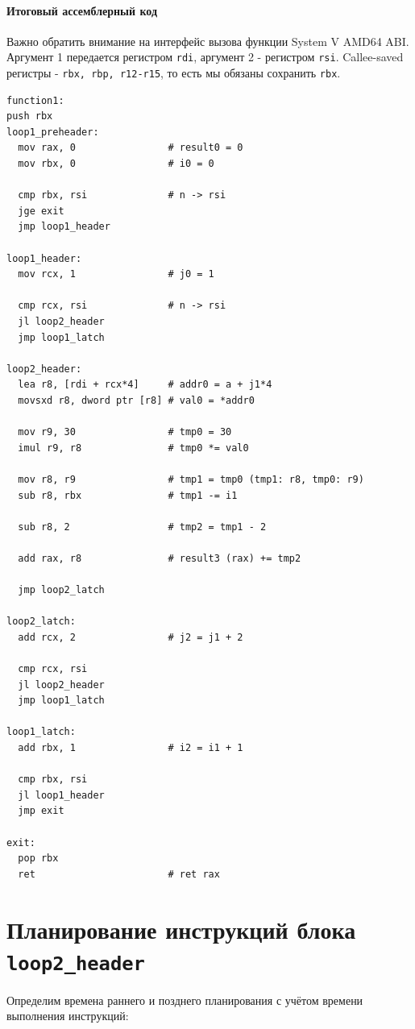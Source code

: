 \newpage

\paragraph{Итоговый ассемблерный код}

Важно обратить внимание на интерфейс вызова функции System V AMD64 ABI. Аргумент 1 передается регистром \texttt{rdi}, аргумент 2 - регистром \texttt{rsi}. Callee-saved регистры - \texttt{rbx, rbp, r12-r15}, то есть мы обязаны сохранить \texttt{rbx}.

\begin{lstlisting}
function1:
push rbx
loop1_preheader:
  mov rax, 0                # result0 = 0
  mov rbx, 0                # i0 = 0
  
  cmp rbx, rsi              # n -> rsi
  jge exit
  jmp loop1_header

loop1_header:
  mov rcx, 1                # j0 = 1

  cmp rcx, rsi              # n -> rsi
  jl loop2_header
  jmp loop1_latch

loop2_header:
  lea r8, [rdi + rcx*4]     # addr0 = a + j1*4
  movsxd r8, dword ptr [r8] # val0 = *addr0
  
  mov r9, 30                # tmp0 = 30
  imul r9, r8               # tmp0 *= val0
  
  mov r8, r9                # tmp1 = tmp0 (tmp1: r8, tmp0: r9)
  sub r8, rbx               # tmp1 -= i1
  
  sub r8, 2                 # tmp2 = tmp1 - 2
  
  add rax, r8               # result3 (rax) += tmp2
  
  jmp loop2_latch

loop2_latch:
  add rcx, 2                # j2 = j1 + 2

  cmp rcx, rsi
  jl loop2_header
  jmp loop1_latch

loop1_latch:
  add rbx, 1                # i2 = i1 + 1

  cmp rbx, rsi
  jl loop1_header
  jmp exit

exit:
  pop rbx
  ret                       # ret rax
\end{lstlisting}


\section{Планирование инструкций блока \texttt{loop2\_header}}

Определим времена раннего и позднего планирования с учётом времени выполнения инструкций:

